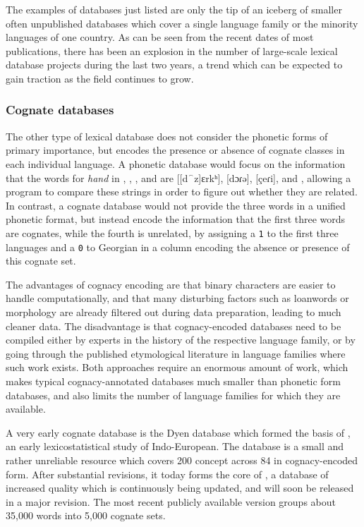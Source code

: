 The examples of databases just listed are only the tip of an iceberg of smaller often unpublished databases which cover a single language family or the minority languages of one country. As can be seen from the recent dates of most publications, there has been an explosion in the number of large-scale lexical database projects during the last two years, a trend which can be expected to gain traction as the field continues to grow.

\subsubsection{Cognate databases}
The other type of lexical database does not consider the phonetic forms of primary importance, but encodes the presence or absence of cognate classes in each individual language. A phonetic database would focus on the information that the words for \textit{hand} in , , , and  are 
{[[d⁀z]εrkʰ]}, 
{[dɔɾə]},
{[çeɾi]}, and
\ipa{[χεlɪ]}, 
allowing a program to compare these strings in order to figure out whether they are related. In contrast, a cognate database would not provide the three words in a unified phonetic format, but instead encode the information that the first three words are cognates, while the fourth is unrelated, by assigning a \texttt{1} to the first three languages  and a \texttt{0} to Georgian in a column encoding the absence or presence of this cognate set.

The advantages of cognacy encoding are that binary characters are easier to handle computationally, and that many disturbing factors such as loanwords or morphology are already filtered out during data preparation, leading to much cleaner data. The disadvantage is that cognacy-encoded databases need to be compiled either by experts in the history of the respective language family, or by going through the published etymological literature in language families where such work exists. Both approaches require an enormous amount of work, which makes typical cognacy-annotated databases much smaller than phonetic form databases, and also limits the number of language families for which they are available.

A very early cognate database is the Dyen database which formed the basis of \citet{dyen_ea_1992}, an early lexicostatistical study of Indo-European. The database is a small and rather unreliable resource \citep{geisler_list_2010} which covers 200 concept across 84  in cognacy-encoded form. After substantial revisions, it today forms the core of  \citep{ielex}, a database of increased quality which is continuously being updated, and will soon be released in a major revision. The most recent publicly available version groups about 35,000 words into 5,000 cognate sets.

